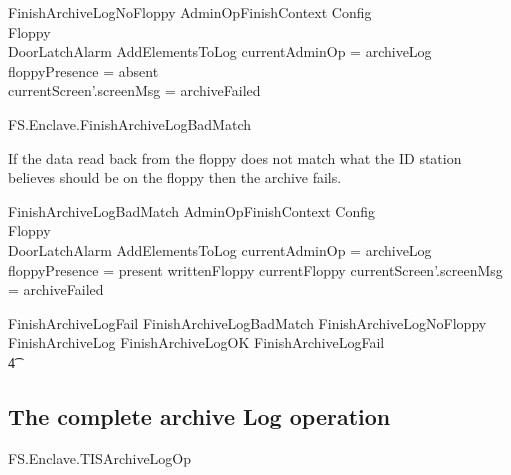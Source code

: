 \begin{schema}{FinishArchiveLogNoFloppy}
        AdminOpFinishContext
\also
        \Xi Config
\\      \Xi Floppy
\\      \Xi DoorLatchAlarm
\also
        AddElementsToLog
\where
       \The currentAdminOp = archiveLog
\\      floppyPresence = absent
\also
\\      currentScreen'.screenMsg = archiveFailed
\end{schema}


\begin{traceunit}{FS.Enclave.FinishArchiveLogBadMatch}
\end{traceunit}


If the data read back from the floppy does not match what the ID
station believes should be on the floppy then the archive fails.

\begin{schema}{FinishArchiveLogBadMatch}
        AdminOpFinishContext
\also
        \Xi Config
\\      \Xi Floppy
\\      \Xi DoorLatchAlarm
\also
        AddElementsToLog
\where
        \The currentAdminOp = archiveLog
\\      floppyPresence = present
\also
        writtenFloppy \neq currentFloppy
\also
        currentScreen'.screenMsg = archiveFailed
\end{schema}

\begin{zed}
        FinishArchiveLogFail  FinishArchiveLogBadMatch \lor
        FinishArchiveLogNoFloppy
\also
        FinishArchiveLog  FinishArchiveLogOK \lor FinishArchiveLogFail
\\ \t4  \lor
        [~ BadAdminLogout | enclaveStatus = waitingFinishAdminOp
\\ \t6  \land \The currentAdminOp = archiveLog      ~]
\end{zed}

\subsection{The complete archive Log operation}

\begin{traceunit}{FS.Enclave.TISArchiveLogOp}
\end{traceunit}


